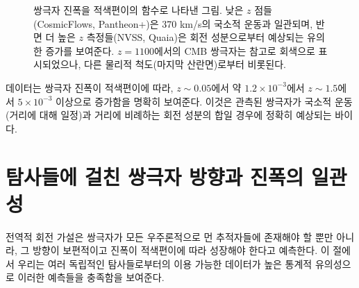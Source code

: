 \documentclass[11pt,a4paper]{article}
\begin{document}
	\begin{figure}[htbp]
		\centering
		\caption{쌍극자 진폭을 적색편이의 함수로 나타낸 그림. 낮은 \(z\) 점들(CosmicFlows, Pantheon+)은 370 km/s의 국소적 운동과 일관되며, 반면 더 높은 \(z\) 측정들(NVSS, Quaia)은 회전 성분으로부터 예상되는 유의한 증가를 보여준다. \(z=1100\)에서의 CMB 쌍극자는 참고로 회색으로 표시되었으나, 다른 물리적 척도(마지막 산란면)로부터 비롯된다.}
		\label{fig:dipole_growth}
	\end{figure}
	
	데이터는 쌍극자 진폭이 적색편이에 따라, \(z\sim0.05\)에서 약 \(1.2 \times 10^{-3}\)에서 \(z\sim1.5\)에서 \(5\times10^{-3}\) 이상으로 증가함을 명확히 보여준다. 이것은 관측된 쌍극자가 국소적 운동(거리에 대해 일정)과 거리에 비례하는 회전 성분의 합일 경우에 정확히 예상되는 바이다.
	
	\section{탐사들에 걸친 쌍극자 방향과 진폭의 일관성}
	
	전역적 회전 가설은 쌍극자가 모든 우주론적으로 먼 추적자들에 존재해야 할 뿐만 아니라, 그 방향이 보편적이고 진폭이 적색편이에 따라 성장해야 한다고 예측한다. 이 절에서 우리는 여러 독립적인 탐사들로부터의 이용 가능한 데이터가 높은 통계적 유의성으로 이러한 예측들을 충족함을 보여준다.
	
\end{document}
